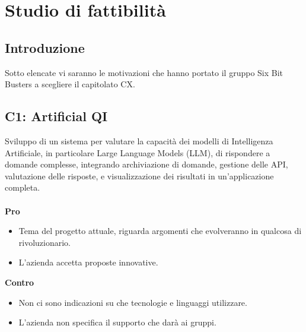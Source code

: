 \section{Studio di fattibilità}

\setcounter{subsection}{0}
\subsection{Introduzione}
Sotto elencate vi saranno le motivazioni che hanno portato il gruppo Six Bit Busters a scegliere il capitolato CX.

\subsection{C1: Artificial QI }
Sviluppo di un sistema per valutare la capacità dei modelli di Intelligenza Artificiale, in particolare Large Language Models (LLM), di rispondere a domande complesse, integrando archiviazione di domande, gestione delle API, valutazione delle risposte, e visualizzazione dei risultati in un'applicazione completa. \\\\
\textbf{Pro}
\begin{itemize}
    \item Tema del progetto attuale, riguarda argomenti che evolveranno in qualcosa di rivoluzionario.
    \item L'azienda accetta proposte innovative.
\end{itemize}
\textbf{Contro}
\begin{itemize}
    \item Non ci sono indicazioni su che tecnologie e linguaggi utilizzare.
    \item L'azienda non specifica il supporto che darà ai gruppi.
\end{itemize}

